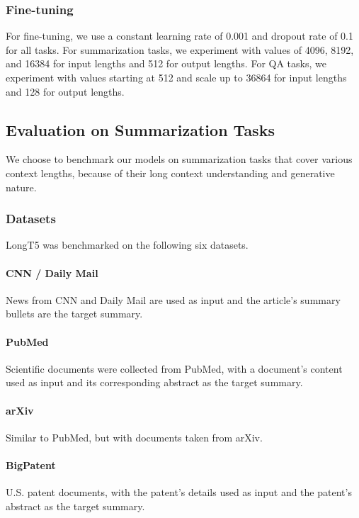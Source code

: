 \subsubsection{Fine-tuning}
For fine-tuning, we use a constant learning rate of 0.001 and dropout rate of 0.1 for all tasks. For summarization tasks, we experiment with values of 4096, 8192, and 16384 for input lengths and 512 for output lengths. For QA tasks, we experiment with values starting at 512 and scale up to 36864 for input lengths and 128 for output lengths.

\subsection{Evaluation on Summarization Tasks} We choose to benchmark our models on summarization tasks that cover various context lengths, because of their long context understanding and generative nature.

\subsubsection{Datasets}\label{subsec:summarization-datasets}
LongT5 was benchmarked on the following six datasets. 

\paragraph{CNN / Daily Mail} \cite{nallapati-etal-2016-abstractive} News from CNN and Daily Mail are used as input and the article's summary bullets are the target summary.

\paragraph{PubMed}\cite{cohan-etal-2018-discourse} Scientific documents were collected from PubMed, with a document's content used as input and its corresponding abstract as the target summary.

\paragraph{arXiv} \cite{cohan-etal-2018-discourse} Similar to PubMed, but with documents taken from arXiv.

\paragraph{BigPatent} \cite{sharma-etal-2019-bigpatent} U.S. patent documents, with the patent's details used as input and the patent's abstract as the target summary.

